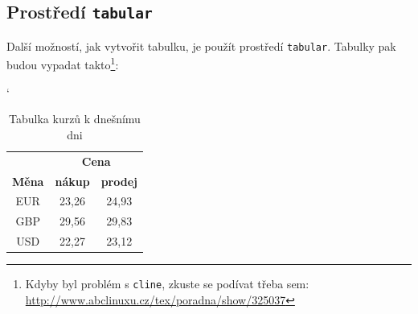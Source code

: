 \documentclass[a4paper,11pt]{article}
\begin{document}
\subsection{Prostředí \texttt{tabular}}
Další možností, jak vytvořit tabulku, je použít prostředí \texttt{tabular}. Tabulky pak budou vypadat takto\footnote{Kdyby byl problém s \texttt{cline}, zkuste se podívat třeba sem: \url{http://www.abclinuxu.cz/tex/poradna/show/325037}}:

\vspace{1.5em}
\begin{table}[h]
    \catcode` %
    \centering
    \begin{tabular}{|c|c|c|}
         \hline & \multicolumn{2}{c|}{\textbf{Cena}} \\ \cline{2-3}
         \textbf{Měna} & \textbf{nákup} & \textbf{prodej} \\ \hline
         EUR & 23,26 & 24,93 \\ 
         GBP & 29,56 & 29,83 \\ 
         USD & 22,27 & 23,12 \\ 
         \hline
    \end{tabular}
    \caption{Tabulka kurzů k dnešnímu dni}
    \label{tab:currency}
\end{table}
\end{document}
